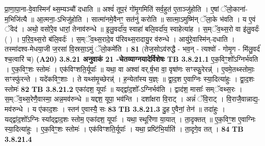 \documentclass[17pt]{extarticle}
\begin{document}
{{{{{{{{{{{{{{{{{{{{{{                  प्रा॒णा॒पा॒ना-वे॒वास्मिन᳚ थ्स॒म्यञ्चौ॑ दधाति ॥ अश्वं॑ तूप॒रं गो॑मृ॒गमिति॑ सर्व॒हुत॑ ए॒ताञ्जु॑होति । ए॒षां ॅलो॒काना॑-म॒भिजि॑त्यै ॥ आ॒त्मना॒-ऽभिजु॑होति । सात्मा॑नमे॒वैनꣳ॒॒ सत॑नुं करोति ॥ सात्मा॒ऽमुष्मि॑न् ॅला॒के भ॑वति । य ए॒वं ॅवेद॑ । अथो॒ वसो॑रे॒व धारां॒ तेनाव॑रुन्धे ॥ इ॒लु॒वर्दा॑य॒ स्वाहा॑ बलि॒वर्दा॑य॒ स्वाहेत्या॑ह । स॒म्ॅव॒थ्स॒रो वा इ॑लु॒वर्दः॑ ( ) । प॒रि॒व॒थ्स॒रो ब॑लि॒वर्दः॑ । स॒म्ॅव॒थ्स॒रादे॒व प॑रिवथ्स॒रादायु॒र व॑रुन्धे । आयु॑रे॒वास्मि॑न्-दधाति । तस्मा॑दश्व-मेधया॒जी ज॒रसा॑ वि॒स्रसा॒ऽमुं ॅलो॒कमे॑ति । \textbf{ 81} \newline
                  \newline
                                    (तेज॒सोऽव॑रुद्धै - भव॒न् - त्यश्वो॑ - गोमृ॒ग - मि॑लु॒वर्द॑ श्च॒त्वारि॑ च) \textbf{(A20)} \newline \newline
                \textbf{ 3.8.21    अनुवाकं   21 -चेतव्याग्नयादेर्विशेषः} \newline
                                \textbf{ TB 3.8.21.1} \newline
                  ए॒क॒विꣳ॒॒शो᳚ऽग्निर्भ॑वति । ए॒क॒विꣳ॒॒शः स्तोमः॑ । एक॑विꣳशति॒र्यूपाः᳚ ॥ यथा॒ वा अश्वा॑ वर्.र्ष॒भा वा॒ वृषा॑णः सꣳस्फु॒रेरन्न्॑ । ए॒वमे॒तथ्स्तोमाः॒ सꣳस्फु॑रन्ते । यदे॑कविꣳ॒॒शाः । ते यथ्स॑मृ॒च्छेरन्न्॑ । ह॒न्येता᳚स्य य॒ज्ञ्ः ॥ द्वा॒द॒श ए॒वाग्निः स्या॒दित्या॑हुः । द्वा॒द॒शः स्तोमः॑ \textbf{ 82} \newline
                  \newline
                                \textbf{ TB 3.8.21.2} \newline
                  एका॑दश॒ यूपाः᳚ ॥ यद्द्वा॑द॒शो᳚-ऽग्निर्भव॑ति । द्वाद॑श॒ मासाः᳚ सम्ॅवथ्स॒रः । स॒म्ॅव॒थ्स॒रेणै॒वास्मा॒ अन्न॒मव॑रुन्धे ॥ यद्दश॒ यूपा॒ भव॑न्ति । दशा᳚क्षरा वि॒राट् । अन्नं॑ ॅवि॒राट् । वि॒राजै॒वान्नाद्य॒-मव॑रुन्धे । य ए॑काद॒शः । स्तन॑ ए॒वास्यै॒ सः \textbf{ 83} \newline
                  \newline
                                \textbf{ TB 3.8.21.3} \newline
                  दु॒ह ए॒वैनां॒ तेन॑ ॥ तदा॑हुः । यद्द्वा॑द॒शो᳚ऽग्निः स्या᳚द्द्वाद॒शः स्तोम॒ एका॑दश॒ यूपाः᳚ । यथा॒ स्थूरि॑णा या॒यात् । ता॒दृक्तत् ॥ ए॒क॒विꣳ॒॒श ए॒वाग्निः स्या॒दित्या॑हुः । ए॒क॒विꣳ॒॒शः स्तोमः॑ । एक॑विꣳशति॒र्यूपाः᳚ । यथा॒ प्रष्टि॑भि॒र्याति॑ । ता॒दृगे॒व तत् । \textbf{ 84} \newline
                  \newline
                                \textbf{ TB 3.8.21.4} \newline
}}}}}}}}}}}}}}}}}}}}}}
\end{document}
